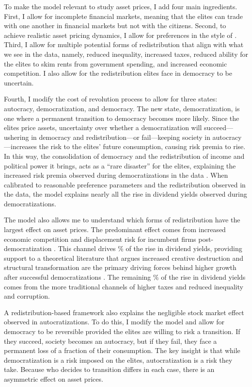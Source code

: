 \documentclass[12pt]{article}
\numberwithin{equation}{section}
\begin{document}
To make the model relevant to study asset prices, I add four main ingredients. First, I allow for incomplete financial markets, meaning that the elites can trade with one another in financial markets but not with the citizens.  Second, to achieve realistic asset pricing dynamics, I allow for preferences in the style of \cite{Epstein1989}. Third, I allow for multiple potential forms of redistribution that align with what we see in the data, namely, reduced inequality, increased taxes, reduced ability for the elites to skim rents from government spending, and increased economic competition. I also allow for the redistribution elites face in democracy to be uncertain.

Fourth, I modify the cost of revolution process to allow for three states: autocracy, democratization, and democracy. The new state, democratization, is one where a permanent transition to democracy becomes more likely. Since the elites price assets, uncertainty over whether a democratization will succeed---ushering in democracy and redistribution---or fail---keeping society in autocracy---increases the risk to the elites' future consumption, causing risk premia to rise. In this way, the consolidation of democracy and the redistribution of income and political power it brings, acts as a ``rare disaster'' for the elites, explaining the increased risk premia observed during democratizations in the data \citep*{Rietz1988, Barro2006a,Gabaix2012,Wachter2013}.  When calibrated to reasonable preference parameters and the redistribution observed in the data, the model explains nearly all the rise in dividend yields observed during democratizations.

The model also allows me to understand which forms of redistribution have the largest effect on asset prices. The predominant effect comes from increased economic competition and displacement risk for incumbent firms post-democratization \citep*{Garleanu2012}. This channel drives \tabTwelveComp\% of the rise in dividend yields, providing support to a theoretical literature that argues increased creative destruction and structural transformation are the primary driving forces behind higher growth after successful democratizations \citep*{Aghion2008,Aghion2014,Acemoglu2015,Bravo2021}. The remaining \tabTwelveNonComp\% of the rise in dividend yields comes from the more traditional channels of higher taxes and reduced inequality and corruption. 

A redistribution-based framework also explains the negligible stock market effect observed in autocratizations. To do this, I modify the model and allow for democracy to be reversible provided the elites are willing to risk a transition. If they succeed, society becomes an autocracy, but if they fail, they face a permanent loss of a fraction of their consumption. The key insight is that while democratization is a risk imposed on the elites, autocratization is a risk they take. Because who decides to transition differs in each case, there is an asymmetric effect on asset prices.
\end{document}
